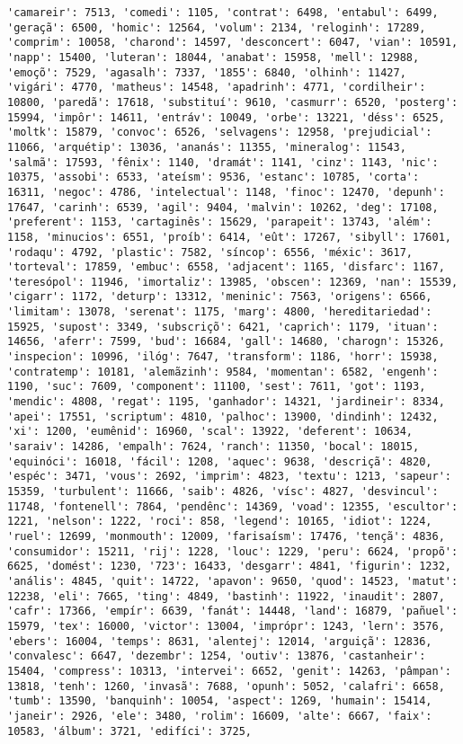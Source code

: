 \begin{Verbatim}[commandchars=\\\{\}]
'camareir': 7513, 'comedi': 1105, 'contrat': 6498, 'entabul': 6499, 'geraçã': 6500, 'homic': 12564, 'volum': 2134, 'reloginh': 17289, 'comprim': 10058, 'charond': 14597, 'desconcert': 6047, 'vian': 10591, 'napp': 15400, 'luteran': 18044, 'anabat': 15958, 'mell': 12988, 'emoçõ': 7529, 'agasalh': 7337, '1855': 6840, 'olhinh': 11427, 'vigári': 4770, 'matheus': 14548, 'apadrinh': 4771, 'cordilheir': 10800, 'paredã': 17618, 'substituí': 9610, 'casmurr': 6520, 'posterg': 15994, 'impôr': 14611, 'entráv': 10049, 'orbe': 13221, 'déss': 6525, 'moltk': 15879, 'convoc': 6526, 'selvagens': 12958, 'prejudicial': 11066, 'arquétip': 13036, 'ananás': 11355, 'mineralog': 11543, 'salmã': 17593, 'fênix': 1140, 'dramát': 1141, 'cinz': 1143, 'nic': 10375, 'assobi': 6533, 'ateísm': 9536, 'estanc': 10785, 'corta': 16311, 'negoc': 4786, 'intelectual': 1148, 'finoc': 12470, 'depunh': 17647, 'carinh': 6539, 'agil': 9404, 'malvin': 10262, 'deg': 17108, 'preferent': 1153, 'cartaginês': 15629, 'parapeit': 13743, 'além': 1158, 'minucios': 6551, 'proíb': 6414, 'eût': 17267, 'sibyll': 17601, 'rodaqu': 4792, 'plastic': 7582, 'síncop': 6556, 'méxic': 3617, 'torteval': 17859, 'embuc': 6558, 'adjacent': 1165, 'disfarc': 1167, 'teresópol': 11946, 'imortaliz': 13985, 'obscen': 12369, 'nan': 15539, 'cigarr': 1172, 'deturp': 13312, 'meninic': 7563, 'origens': 6566, 'limitam': 13078, 'serenat': 1175, 'marg': 4800, 'hereditariedad': 15925, 'supost': 3349, 'subscriçõ': 6421, 'caprich': 1179, 'ituan': 14656, 'aferr': 7599, 'bud': 16684, 'gall': 14680, 'charogn': 15326, 'inspecion': 10996, 'ilóg': 7647, 'transform': 1186, 'horr': 15938, 'contratemp': 10181, 'alemãzinh': 9584, 'momentan': 6582, 'engenh': 1190, 'suc': 7609, 'component': 11100, 'sest': 7611, 'got': 1193, 'mendic': 4808, 'regat': 1195, 'ganhador': 14321, 'jardineir': 8334, 'apei': 17551, 'scriptum': 4810, 'palhoc': 13900, 'dindinh': 12432, 'xi': 1200, 'eumênid': 16960, 'scal': 13922, 'deferent': 10634, 'saraiv': 14286, 'empalh': 7624, 'ranch': 11350, 'bocal': 18015, 'equinóci': 16018, 'fácil': 1208, 'aquec': 9638, 'descriçã': 4820, 'espéc': 3471, 'vous': 2692, 'imprim': 4823, 'textu': 1213, 'sapeur': 15359, 'turbulent': 11666, 'saib': 4826, 'vísc': 4827, 'desvincul': 11748, 'fontenell': 7864, 'pendênc': 14369, 'voad': 12355, 'escultor': 1221, 'nelson': 1222, 'roci': 858, 'legend': 10165, 'idiot': 1224, 'ruel': 12699, 'monmouth': 12009, 'farisaísm': 17476, 'tençã': 4836, 'consumidor': 15211, 'rij': 1228, 'louc': 1229, 'peru': 6624, 'propõ': 6625, 'domést': 1230, '723': 16433, 'desgarr': 4841, 'figurin': 1232, 'anális': 4845, 'quit': 14722, 'apavon': 9650, 'quod': 14523, 'matut': 12238, 'eli': 7665, 'ting': 4849, 'bastinh': 11922, 'inaudit': 2807, 'cafr': 17366, 'empír': 6639, 'fanát': 14448, 'land': 16879, 'pañuel': 15979, 'tex': 16000, 'victor': 13004, 'imprópr': 1243, 'lern': 3576, 'ebers': 16004, 'temps': 8631, 'alentej': 12014, 'arguiçã': 12836, 'convalesc': 6647, 'dezembr': 1254, 'outiv': 13876, 'castanheir': 15404, 'compress': 10313, 'intervei': 6652, 'genit': 14263, 'pâmpan': 13818, 'tenh': 1260, 'invasã': 7688, 'opunh': 5052, 'calafri': 6658, 'tumb': 13590, 'banquinh': 10054, 'aspect': 1269, 'humain': 15414, 'janeir': 2926, 'ele': 3480, 'rolim': 16609, 'alte': 6667, 'faix': 10583, 'álbum': 3721, 'edifíci': 3725, 
\end{Verbatim}
